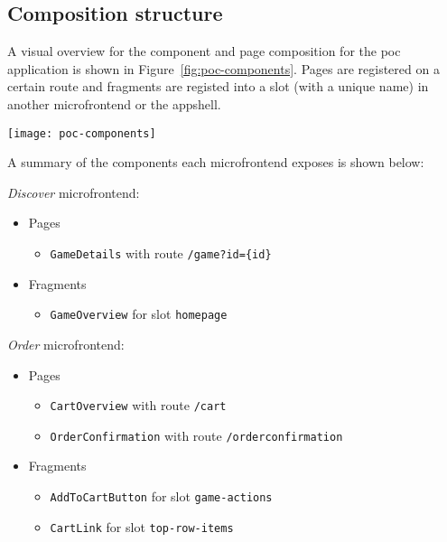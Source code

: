 \subsection{Composition structure}
\label{ssec:poc-composition}

A visual overview for the component and page composition for the \gls{poc}
application is shown in Figure~\ref{fig:poc-components}. Pages are registered on
a certain route and fragments are registed into a slot (with a unique name) in
another \gls{microfrontend} or the \gls{appshell}.

\begin{sidewaysfigure}
  \centering
  \texttt{[image: poc-components]}
  \caption[Visual overview for proof-of-concept solution]{A visual overview for
  the component and page composition for the \gls{poc} application. The colored
  dashed lines indicate the sources of the components (blue for
  \textit{``Order''} \gls{microfrontend}, orange for \textit{``Discover''}).}
  \label{fig:poc-components}
\end{sidewaysfigure}

A summary of the components each \gls{microfrontend} exposes is shown below:
\begin{framed}
  \textit{Discover}  \gls{microfrontend}:
    \begin{itemize}
      \item[] Pages
      \begin{itemize}
        \item \texttt{GameDetails} with route \texttt{/game?id=\{id\}}
      \end{itemize}
      \item[] Fragments
      \begin{itemize}
        \item \texttt{GameOverview} for slot \texttt{homepage}
      \end{itemize}
    \end{itemize}
  \textit{Order} \gls{microfrontend}:
    \begin{itemize}
      \item[] Pages
      \begin{itemize}
        \item \texttt{CartOverview} with route \texttt{/cart}
        \item \texttt{OrderConfirmation} with route \texttt{/orderconfirmation}
      \end{itemize}
      \item[] Fragments
      \begin{itemize}
        \item \texttt{AddToCartButton} for slot \texttt{game-actions}
        \item \texttt{CartLink} for slot \texttt{top-row-items}
      \end{itemize}
    \end{itemize}
\end{framed} 






